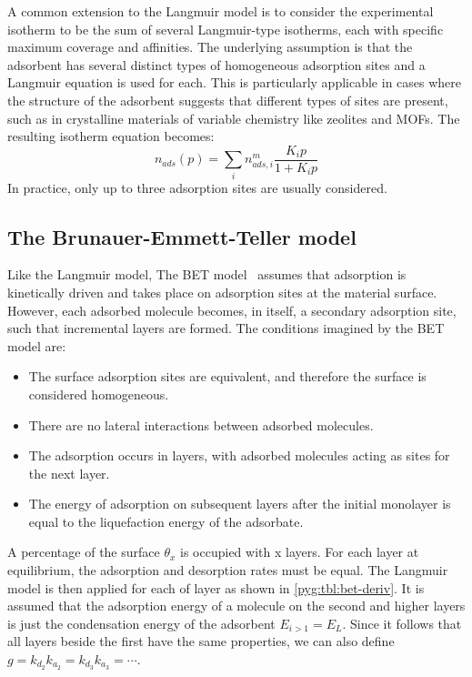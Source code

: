 A common extension to the Langmuir model is to consider
the experimental isotherm to be the sum of several Langmuir-type
isotherms, each with specific maximum coverage and affinities.
The underlying assumption is that the adsorbent has several distinct
types of homogeneous adsorption sites and a Langmuir
equation is used for each. This is particularly
applicable in cases where the structure of the adsorbent
suggests that different types of sites are present,
such as in crystalline materials of variable chemistry like
zeolites and \glspl{MOF}. The resulting isotherm equation becomes:
%
\begin{equation}\label{pyg:eqn:langmulti}
	n_{ads}(p) = \sum_i n_{ads,i}^m\frac{K_i p}{1+K_i p}
\end{equation}
%
In practice, only up to three adsorption sites are usually
considered.

\subsection{The Brunauer-Emmett-Teller model}\label{pyg:models:bet}

Like the Langmuir model, The \gls{BET} model~\cite{brunauerAdsorptionGasesMultimolecular1938}
assumes that adsorption is kinetically driven and takes place on adsorption
sites at the material surface. However, each adsorbed molecule becomes,
in itself, a secondary adsorption site, such that incremental layers
are formed. The conditions imagined by the \gls{BET} model are:

\begin{itemize}
	\item The surface adsorption sites are equivalent, and therefore the
	      surface is considered homogeneous.
	\item There are no lateral interactions between adsorbed
	      molecules.
	\item The adsorption occurs in layers, with adsorbed
	      molecules acting as sites for the next layer.
	\item The energy of adsorption on subsequent layers after 
		  the initial monolayer is equal to the liquefaction energy
		  of the adsorbate.
\end{itemize}

A percentage of the surface \(\theta_x\) is occupied with
x layers. For each layer at equilibrium, the adsorption and
desorption rates must be equal.
The Langmuir model is then applied for each of layer
as shown in \autoref{pyg:tbl:bet-deriv}. It is assumed
that the adsorption energy of a molecule on the second
and higher layers is just the condensation energy of the
adsorbent \(E_{i>1} = E_L\). Since it follows that
all layers beside the first have the same properties,
we can also define \(g= {k_{d_2}}{k_{a_2}} = {k_{d_3}}{k_{a_3}} =
\cdots \).

